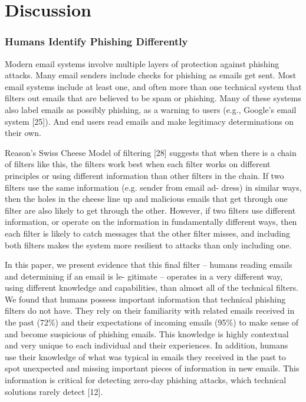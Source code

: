 \documentclass[lettersize,journal]{IEEEtran}
\begin{document}
\section{Discussion}

\subsubsection{Humans Identify Phishing Differently}

Modern email systems involve multiple layers of protection against phishing
attacks. Many email senders include checks for phishing as emails get sent.
Most email systems include at least one, and often more than one technical
system that filters out emails that are believed to be spam or phishing. Many
of these systems also label emails as possibly phishing, as a warning to users
(e.g., Google’s email system [25]). And end users read emails and make
legitimacy determinations on their own.

Reason’s Swiss Cheese Model of filtering [28] suggests that when there is a
chain of filters like this, the filters work best when each filter works on
different principles or using different information than other filters in the
chain. If two filters use the same information (e.g. sender from email ad-
dress) in similar ways, then the holes in the cheese line up and malicious
emails that get through one filter are also likely to get through the other.
However, if two filters use different information, or operate on the
information in fundamentally different ways, then each filter is likely to
catch messages that the other filter misses, and including both filters makes
the system more resilient to attacks than only including one.

In this paper, we present evidence that this final filter – humans reading
emails and determining if an email is le- gitimate – operates in a very
different way, using different knowledge and capabilities, than almost all of
the technical filters. We found that humans possess important information that
technical phishing filters do not have. They rely on their familiarity with
related emails received in the past (72\%) and their expectations of incoming
emails (95\%) to make sense of and become suspicious of phishing emails. This
knowledge is highly contextual and very unique to each individual and their
experiences. In addition, humans use their knowledge of what was typical in
emails they received in the past to spot unexpected and missing important
pieces of information in new emails. This information is critical for detecting
zero-day phishing attacks, which technical solutions rarely detect [12].
\end{document}
